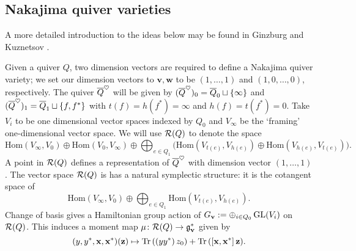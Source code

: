 \documentclass{amsart}
\theoremstyle{definition}
\renewcommand{\Tr}{\textup{Tr}\,}
\begin{document}
\subsection{Nakajima quiver varieties}\label{sc:back}
A more detailed introduction to the ideas below may be found in Ginzburg \cite{Ginzburg} and Kuznetsov \cite{Kuznetsov}.

Given a quiver $Q$, two dimension vectors are required to define a Nakajima quiver variety; we set our dimension vectors to $\mathbf{v}, \mathbf{w}$ to be $(1,\dots,1)$ and $(1,0,\ldots, 0)$, respectively.
The quiver ${\overline{Q}}^\heartsuit$ will be given by $({\overline{Q}}^\heartsuit)_0 = {\overline{Q}}_0 \sqcup \{\infty\}$ and $({\overline{Q}}^\heartsuit)_1 = {\overline{Q}}_1 \sqcup \{f,f^*\}$ with $t(f) = h(f^*) = \infty$ and $h(f) = t(f^*) = 0$.
Take $V_i$ to be one dimensional vector spaces indexed by $Q_0$ and $V_\infty$ be the `framing' one-dimensional vector space. 
We will use $\mathcal{R}(Q)$ to denote the space $$\text{Hom}(V_\infty, V_0) \oplus \text{Hom}(V_0, V_\infty) \oplus \bigoplus_{e \in Q_1}\big(\text{Hom}(V_{t(e)}, V_{h(e)}) \oplus \text{Hom}(V_{h(e)}, V_{t(e)})\big).$$
A point in $\mathcal{R}(Q)$ defines a representation of ${\overline{Q}}^\heartsuit$ with dimension vector $(1,\ldots,1)$.
The vector space $\mathcal{R}(Q)$ is has a natural symplectic structure: it is the cotangent space of $$\text{Hom}(V_\infty, V_0) \oplus \bigoplus_{e \in Q_1}\text{Hom}(V_{t(e)}, V_{h(e)}).$$
Change of basis gives a Hamiltonian group action of $G_\mathbf{v}:= \oplus_{i \in Q_0} \operatorname{GL}(V_i)$ on $\mathcal{R}(Q)$. 
This induces a moment map $\mu \colon \mathcal{R}(Q) \rightarrow \mathfrak{g}_{\mathbf{v}}^*$ given by $$(y,y^*,\bfx,\bfx^*)(\bfz) \mapsto  \Tr((yy^*)\,z_0) + \Tr([\bfx,\bfx^*]\,\bfz).$$
\end{document}
